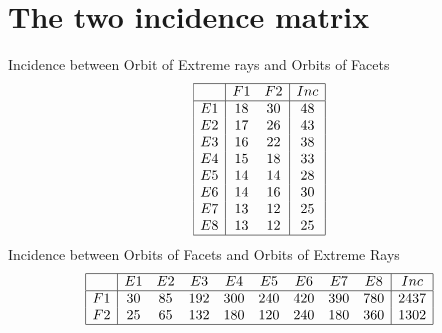\documentclass[12pt]{article}
\begin{document}
\section{The two incidence matrix}
Incidence between Orbit of Extreme rays and Orbits of Facets
\begin{equation*}
\begin{array}{|c|cc|c|}
\hline
&F1&F2&Inc\\
\hline
E1&18&30&48\\
E2&17&26&43\\
E3&16&22&38\\
E4&15&18&33\\
E5&14&14&28\\
E6&14&16&30\\
E7&13&12&25\\
E8&13&12&25\\
\hline
\end{array}
\end{equation*}
Incidence between Orbits of Facets and Orbits of Extreme Rays
\begin{equation*}
\begin{array}{|c|cccccccc|c|}
\hline
&E1&E2&E3&E4&E5&E6&E7&E8&Inc\\
\hline
F1&30&85&192&300&240&420&390&780&2437\\
F2&25&65&132&180&120&240&180&360&1302\\
\hline
\end{array}
\end{equation*}
\end{document}
